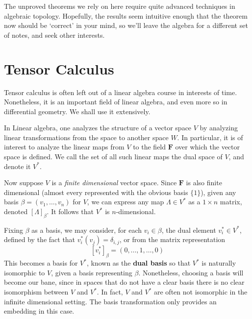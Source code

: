 The unproved theorems we rely on here require quite advanced techniques in algebraic topology. Hopefully, the results seem intuitive enough that the theorem now should be `correct' in your mind, so we'll leave the algebra for a different set of notes, and seek other interests.






































\chapter{Tensor Calculus}

Tensor calculus is often left out of a linear algebra course in interests of time. Nonetheless, it is an important field of linear algebra, and even more so in differential geometry. We shall use it extensively.

In Linear algebra, one analyzes the structure of a vector space $V$ by analyzing linear transformations from the space to another space $W$. In particular, it is of interest to analyze the linear maps from $V$ to the field $\mathbf{F}$ over which the vector space is defined. We call the set of all such linear maps the dual space of $V$, and denote it $V^*$.

Now suppose $V$ is a {\it finite dimensional} vector space. Since $\mathbf{F}$ is also finite dimensional (almost every represented with the obvious basis $\{ 1 \}$), given any basis $\beta = (v_1, \dots, v_n)$ for $V$, we can express any map $\Lambda \in V^*$ as a $1 \times n$ matrix, denoted $[\Lambda]_{\beta}$. It follows that $V^*$ is $n$-dimensional.

Fixing $\beta$ as a basis, we may consider, for each $v_i \in \beta$, the dual element $v_i^* \in V^*$, defined by the fact that $v_i^*(v_j) = \delta_{i,j}$, or from the matrix representation
%
\[ [v_i^*]_\beta = (0, \dots, 1, \dots, 0) \]
%
This becomes a basis for $V^*$, known as the {\bf dual basis} so that $V^*$ is naturally isomorphic to $V$, given a basis representing $\beta$. Nonetheless, choosing a basis will become our bane, since in spaces that do not have a clear basis there is no clear isomorphism between $V$ and $V^*$. In fact, $V$ and $V^*$ are often not isomorphic in the infinite dimensional setting. The basis transformation only provides an embedding in this case.


